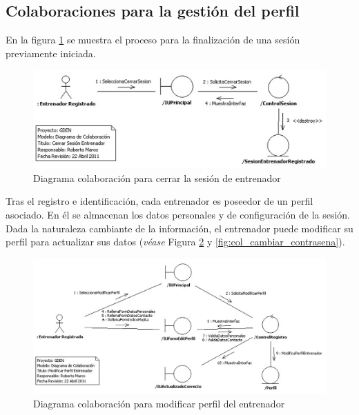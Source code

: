 	
		\subsection{Colaboraciones para la gestión del perfil} %
			\label{sub:colaboraciones_para_la_gestion_del_perfil}
			
		En la figura \ref{fig:col_cerrar_sesion_entrenador} se muestra el proceso para la finalización de una sesión previamente iniciada.
		
			\begin{figure}[H]
			  \centering
			    \includegraphics[width=16cm]{./eps/colaboraciones/gestion_perfil/CerrarSesionEntrenador.eps}
			  \caption{Diagrama colaboración para cerrar la sesión de entrenador}
			  \label{fig:col_cerrar_sesion_entrenador}
			\end{figure}
		
		Tras el registro e identificación, cada entrenador es poseedor de un perfil asociado. En él se almacenan los datos personales y de configuración de la sesión. Dada la naturaleza cambiante de la información, el entrenador puede modificar su perfil para actualizar sus datos ({\it véase} Figura \ref{fig:col_modificar_perfil} y \ref{fig:col_cambiar_contrasena}).
			
			\begin{figure}[H]
			  \centering
			    \includegraphics[width=16cm]{./eps/colaboraciones/gestion_perfil/ModificarPerfilEntrenador.eps}
			  \caption{Diagrama colaboración para modificar perfil del entrenador}
			  \label{fig:col_modificar_perfil}
			\end{figure}
			
